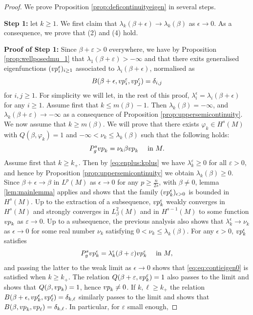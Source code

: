 \documentclass[10pt,a4paper]{amsart}
\def\ep{{\varepsilon}}
\newcommand{\ve}{\varepsilon}
\newcommand{\vp}{{\rm vp}}
\begin{document}
\begin{proof}
We prove Proposition \ref{prop:deficontinuityeigen} in several steps. 

\medskip

\textbf{Step 1:} let $k \ge 1$. We first claim that $\lambda_k(\beta + \epsilon) \to \lambda_k(\beta)$ as $\epsilon \to 0$. As a consequence, we prove that (2) and (4) hold. 

\medskip 


\textbf{Proof of Step 1:} 
Since $\beta+\ep >0$ everywhere, we have by Proposition \ref{prop:wellposedmu_1} that $\lambda_1(\beta + \ep ) > -\infty$ and that there exits generalised eigenfunctions $(\vp_i^\epsilon)_{i\geq 1}$ associated to $\lambda_i(\beta + \epsilon)$, normalised as 
$$B(\beta+\epsilon,\vp_i^\epsilon,\vp_j^\epsilon) = \delta_{i,j}$$ 
for $i,j \geq 1$.  For simplicity we will let, in the rest of this proof, $\lambda_i^{\epsilon} = \lambda_i(\beta+\epsilon)$ for any $i \ge 1$. Assume first that $k \le m(\beta)-1$. 
Then $\lambda_k(\beta) = -\infty$, and $\lambda_k(\beta + \ep) \to -\infty$ as a consequence of Proposition \ref{prop:uppersemicontinuity}. 
We now assume that $k\ge m(\beta)$. We will prove that there exists $\varphi_k \in H^s(M)$ with $Q(\beta, \varphi_k) = 1$ and $- \infty < \nu_k \le \lambda_k(\beta)$ such that the following holds: 
\begin{equation} \label{eq:eq:contieigen0}
P_g^s \vp_k = \nu_k \beta \vp_k \quad \text{ in } M. 
\end{equation}
Assume first that $k \ge k_+$. Then by \eqref{eq:enplus:kplus} we have $\lambda_k^\ep \geq 0$ for all $\ep >0$, and hence by Proposition \ref{prop:uppersemicontinuity} we obtain $\lambda_k(\beta)\geq 0$. Since $\beta + \epsilon \to \beta$ in $L^p(M)$ as $\epsilon \to 0$ for any $p \ge \frac{n}{2s}$, with $\beta\neq 0$, lemma \ref{lem:mainlemma} applies and shows that the family $(\vp_k^\epsilon)_{\epsilon >0}$ is bounded in $H^s(M)$. Up to the extraction of a subsequence, $\vp_k^\epsilon$ weakly converges  in $H^s(M)$ and strongly converges in $L^2_\beta(M)$ and in $H^{s-1}(M)$ to some function $\vp_k$ as $\ep \to 0$. Up to a subsequence, the previous analysis also shows that $\lambda_k^\epsilon \to \nu_k$ as $\epsilon \to 0$ for some real number $\nu_k$ satisfying $0 < \nu_k \leq \lambda_k(\beta)$. For any $\epsilon >0$, $\vp_k^{\epsilon}$ satisfies 
$$P_g^s \vp_k^{\epsilon} = \lambda_k^{\epsilon}(\beta + \ep) \vp_k^{\epsilon} \quad \text{ in } M, $$
and passing the latter to the weak limit as $\epsilon \to 0$ shows that \eqref{eq:eq:contieigen0} is satisfied when $k \ge k_+$. The relation $Q(\beta+\ve, \vp_k^{\ep} )=1$ also passes to the limit and shows that $Q(\beta, \vp_k) = 1$, hence $\vp_k \neq 0$. If $k, \ell \ge k_+$ the relation $B(\beta+\epsilon,\vp_k^\epsilon,\vp_\ell^\epsilon) = \delta_{k,\ell}$ similarly passes to the limit and shows that $ B(\beta,\vp_k,\vp_\ell) = \delta_{k,\ell}$.  In particular, for $\ep$ small enough,

\end{proof}
\end{document}
